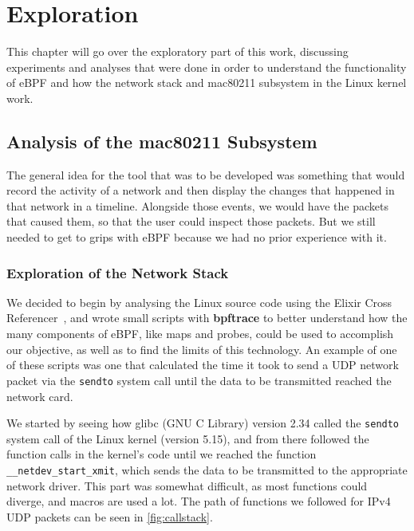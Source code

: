 \chapter{Exploration}\label{chap:expl}

This chapter will go over the exploratory part of this work, discussing
experiments and analyses that were done in order to understand the functionality
of eBPF and how the network stack and mac80211 subsystem in the Linux kernel
work.


\section{Analysis of the mac80211 Subsystem}\label{sect:mac802}

The general idea for the tool that was to be developed was something that would
record the activity of a network and then display the changes that happened in
that network in a timeline. Alongside those events, we would have the packets
that caused them, so that the user could inspect those packets. But we still
needed to get to grips with eBPF because we had no prior experience with it.


\subsection{Exploration of the Network Stack}

We decided to begin by analysing the Linux source code using the Elixir Cross
Referencer~\cite{elixir}, and wrote small scripts with \textbf{bpftrace} to
better understand how the many components of eBPF, like maps and probes, could
be used to accomplish our objective, as well as to find the limits of this
technology. An example of one of these scripts was one that calculated the time
it took to send a \ac{UDP} network packet via the \texttt{sendto} system call
until the data to be transmitted reached the network card.

We started by seeing how glibc (GNU C Library) version 2.34 called the
\texttt{sendto} system call of the Linux kernel (version 5.15), and from there
followed the function calls in the kernel's code until we reached the function
\texttt{\_\_netdev\_start\_xmit}, which sends the data to be transmitted to the
appropriate network driver. This part was somewhat difficult, as most functions
could diverge, and macros are used a lot. The path of functions we followed for
IPv4 \ac{UDP} packets can be seen in \autoref{fig:callstack}.

